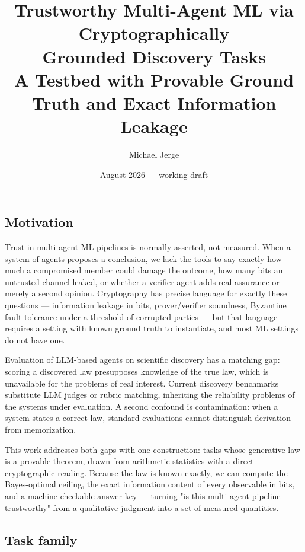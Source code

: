 \documentclass[10pt]{article}
\title{\Large\bfseries Trustworthy Multi-Agent ML via Cryptographically\\
Grounded Discovery Tasks\\
\large A Testbed with Provable Ground Truth and Exact Information Leakage}
\author{Michael Jerge}
\date{August 2026 --- working draft}
\begin{document}
\maketitle
\thispagestyle{empty}

\subsection*{Motivation}

Trust in multi-agent ML pipelines is normally asserted, not measured.
When a system of agents proposes a conclusion, we lack the tools to
say exactly how much a compromised member could damage the outcome,
how many bits an untrusted channel leaked, or whether a verifier agent
adds real assurance or merely a second opinion. Cryptography has
precise language for exactly these questions --- information leakage
in bits, prover/verifier soundness, Byzantine fault tolerance under a
threshold of corrupted parties --- but that language requires a setting
with known ground truth to instantiate, and most ML settings do not
have one.

Evaluation of LLM-based agents on scientific discovery has a matching
gap: scoring a discovered law presupposes knowledge of the true law,
which is unavailable for the problems of real interest. Current
discovery benchmarks substitute LLM judges or rubric matching,
inheriting the reliability problems of the systems under evaluation. A
second confound is contamination: when a system states a correct law,
standard evaluations cannot distinguish derivation from memorization.

This work addresses both gaps with one construction: tasks whose
generative law is a provable theorem, drawn from arithmetic statistics
with a direct cryptographic reading. Because the law is known exactly,
we can compute the Bayes-optimal ceiling, the exact information content
of every observable in bits, and a machine-checkable answer key ---
turning "is this multi-agent pipeline trustworthy" from a qualitative
judgment into a set of measured quantities.

\subsection*{Task family}
\end{document}
